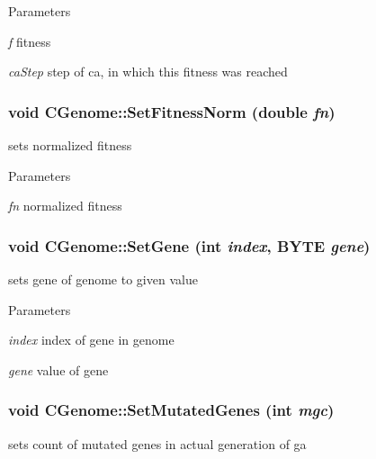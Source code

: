 \begin{DoxyParams}{Parameters}
\item[{\em f}]fitness \item[{\em caStep}]step of ca, in which this fitness was reached \end{DoxyParams}
\hypertarget{classCGenome_a7c7e21d4d46a594aae09229a2aa5d814}{
\subsubsection[{SetFitnessNorm}]{\setlength{\rightskip}{0pt plus 5cm}void CGenome::SetFitnessNorm (double {\em fn})}}
\label{classCGenome_a7c7e21d4d46a594aae09229a2aa5d814}
sets normalized fitness


\begin{DoxyParams}{Parameters}
\item[{\em fn}]normalized fitness \end{DoxyParams}
\hypertarget{classCGenome_ad657f8d74e59406cd4c204de9de7b521}{
\subsubsection[{SetGene}]{\setlength{\rightskip}{0pt plus 5cm}void CGenome::SetGene (int {\em index}, \/  BYTE {\em gene})}}
\label{classCGenome_ad657f8d74e59406cd4c204de9de7b521}
sets gene of genome to given value


\begin{DoxyParams}{Parameters}
\item[{\em index}]index of gene in genome \item[{\em gene}]value of gene \end{DoxyParams}
\hypertarget{classCGenome_afae4fdef83e9dd66e700c10309396481}{
\subsubsection[{SetMutatedGenes}]{\setlength{\rightskip}{0pt plus 5cm}void CGenome::SetMutatedGenes (int {\em mgc})}}
\label{classCGenome_afae4fdef83e9dd66e700c10309396481}
sets count of mutated genes in actual generation of ga


